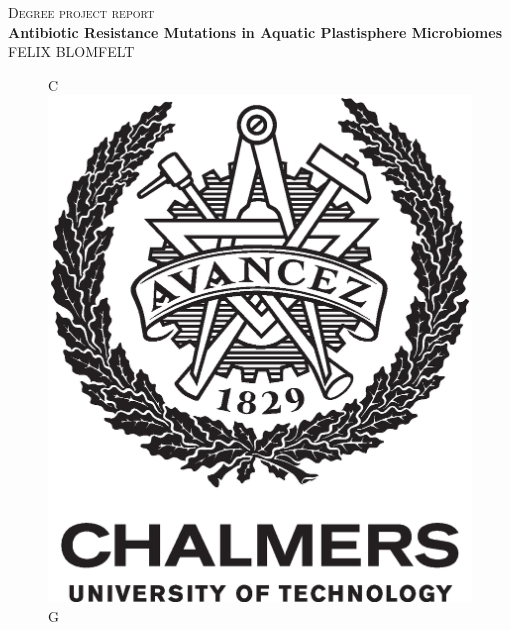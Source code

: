 \newpage
\thispagestyle{empty}
\begin{center}
    \textsc{\large Degree project report \the\year}\\[4cm]
    \textbf{\Large Antibiotic Resistance Mutations in Aquatic Plastisphere Microbiomes} \\[1cm]
    {\large FELIX BLOMFELT}
    \vfill	
    \begin{figure}[H]
        \centering
        \if\InstitutionLocation C   %
        \includegraphics[width=0.2\pdfpagewidth]{figure/auxiliary/AvancezChalmersU_black_centered.eps} \\
        \fi
        \if\InstitutionLocation G

\end{figure}
\end{center}
